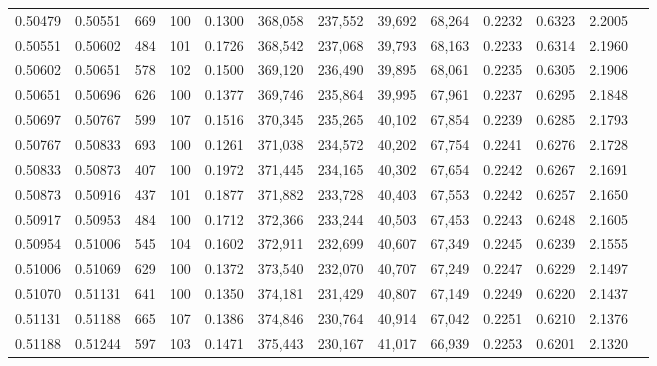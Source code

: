 \begin{tabular}{rrrrrrrrrrrrr}
0.50479 & 0.50551 &   669 & 100 &                                     0.1300 & 368,058 & 237,552 &  39,692 &  68,264 & 0.2232 & 0.6323 & 2.2005 \\
0.50551 & 0.50602 &   484 & 101 &                                     0.1726 & 368,542 & 237,068 &  39,793 &  68,163 & 0.2233 & 0.6314 & 2.1960 \\
0.50602 & 0.50651 &   578 & 102 &                                     0.1500 & 369,120 & 236,490 &  39,895 &  68,061 & 0.2235 & 0.6305 & 2.1906 \\
0.50651 & 0.50696 &   626 & 100 &                                     0.1377 & 369,746 & 235,864 &  39,995 &  67,961 & 0.2237 & 0.6295 & 2.1848 \\
0.50697 & 0.50767 &   599 & 107 &                                     0.1516 & 370,345 & 235,265 &  40,102 &  67,854 & 0.2239 & 0.6285 & 2.1793 \\
0.50767 & 0.50833 &   693 & 100 &                                     0.1261 & 371,038 & 234,572 &  40,202 &  67,754 & 0.2241 & 0.6276 & 2.1728 \\
0.50833 & 0.50873 &   407 & 100 &                                     0.1972 & 371,445 & 234,165 &  40,302 &  67,654 & 0.2242 & 0.6267 & 2.1691 \\
0.50873 & 0.50916 &   437 & 101 &                                     0.1877 & 371,882 & 233,728 &  40,403 &  67,553 & 0.2242 & 0.6257 & 2.1650 \\
0.50917 & 0.50953 &   484 & 100 &                                     0.1712 & 372,366 & 233,244 &  40,503 &  67,453 & 0.2243 & 0.6248 & 2.1605 \\
0.50954 & 0.51006 &   545 & 104 &                                     0.1602 & 372,911 & 232,699 &  40,607 &  67,349 & 0.2245 & 0.6239 & 2.1555 \\
0.51006 & 0.51069 &   629 & 100 &                                     0.1372 & 373,540 & 232,070 &  40,707 &  67,249 & 0.2247 & 0.6229 & 2.1497 \\
0.51070 & 0.51131 &   641 & 100 &                                     0.1350 & 374,181 & 231,429 &  40,807 &  67,149 & 0.2249 & 0.6220 & 2.1437 \\
0.51131 & 0.51188 &   665 & 107 &                                     0.1386 & 374,846 & 230,764 &  40,914 &  67,042 & 0.2251 & 0.6210 & 2.1376 \\
0.51188 & 0.51244 &   597 & 103 &                                     0.1471 & 375,443 & 230,167 &  41,017 &  66,939 & 0.2253 & 0.6201 & 2.1320 \\

\end{tabular}
